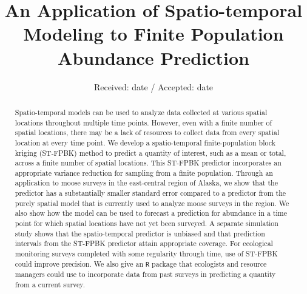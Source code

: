 \documentclass[smallextended]{svjour3}       %
\begin{document}
\title{An Application of Spatio-temporal Modeling to Finite Population
Abundance Prediction }



\author{  }


\institute{
    }

\date{Received: date / Accepted: date}


\maketitle

\begin{abstract}
Spatio-temporal models can be used to analyze data collected at various
spatial locations throughout multiple time points. However, even with a
finite number of spatial locations, there may be a lack of resources to
collect data from every spatial location at every time point. We develop
a spatio-temporal finite-population block kriging (ST-FPBK) method to
predict a quantity of interest, such as a mean or total, across a finite
number of spatial locations. This ST-FPBK predictor incorporates an
appropriate variance reduction for sampling from a finite population.
Through an application to moose surveys in the east-central region of
Alaska, we show that the predictor has a substantially smaller standard
error compared to a predictor from the purely spatial model that is
currently used to analyze moose surveys in the region. We also show how
the model can be used to forecast a prediction for abundance in a time
point for which spatial locations have not yet been surveyed. A separate
simulation study shows that the spatio-temporal predictor is unbiased
and that prediction intervals from the ST-FPBK predictor attain
appropriate coverage. For ecological monitoring surveys completed with
some regularity through time, use of ST-FPBK could improve precision. We
also give an \texttt{R} package that ecologists and resource managers
could use to incorporate data from past surveys in predicting a quantity
from a current survey.
\\


\end{abstract}


\def\spacingset#1{\renewcommand{\baselinestretch}%
{#1}\small\normalsize} \spacingset{1}
\end{document}
